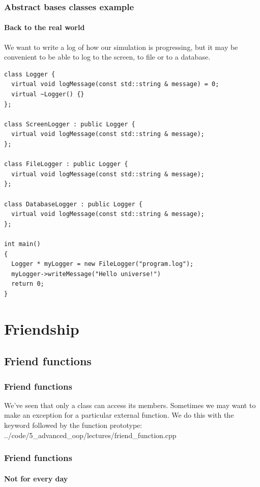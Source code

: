 \documentclass{beamer}
\begin{document}
\begin{frame}[fragile]
  \frametitle{Abstract bases classes example}
  \framesubtitle{Back to the real world}
  We want to write a log of how our simulation is progressing, but it may be convenient to be able to log to the screen, to file or to a database.
  \begin{lstlisting}[basicstyle=\ttfamily\fontsize{7}{8}\selectfont]
class Logger {
  virtual void logMessage(const std::string & message) = 0;
  virtual ~Logger() {}
};

class ScreenLogger : public Logger {
  virtual void logMessage(const std::string & message);
};

class FileLogger : public Logger {
  virtual void logMessage(const std::string & message);
};

class DatabaseLogger : public Logger {
  virtual void logMessage(const std::string & message);
};

int main()
{
  Logger * myLogger = new FileLogger("program.log");
  myLogger->writeMessage("Hello universe!")
  return 0;
}
  \end{lstlisting}

\end{frame}


\section{Friendship}

\subsection{Friend functions}

\begin{frame}[fragile]
  \frametitle{Friend functions}
  
  We've seen that only a class can access its  members.  Sometimes we may want to make an exception for a particular external function.  We do this with the  keyword followed by the function prototype:
  \pause
    {../code/5_advanced_oop/lectures/friend_function.cpp}

\end{frame}

\begin{frame}[fragile]
  \frametitle{Friend functions}
  \framesubtitle{Not for every day}
  

\end{frame}
\end{document}
